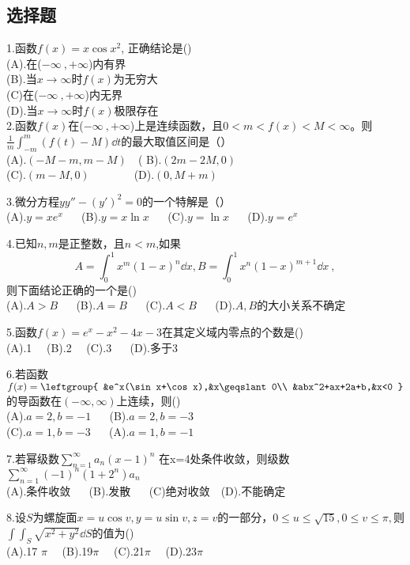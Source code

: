 



\subsection{选择题}
1.函数$f(x)=x\cos x^2$, 正确结论是()\\
(A).在($-\infty~,+\infty$)内有界\\
(B).当$x\to\infty$时$f(x)$为无穷大\\
(C)在($-\infty~,+\infty$)内无界\\
(D).当$x\to\infty$时$f(x)$极限存在\\

2.函数$f(x)$在($-\infty~,+\infty$)上是连续函数，且$0<m<f(x)<M<\infty$。则
$ \frac{1}{m} \int_{-m}^{m}(f(t)-M )\dd{t}$的最大取值区间是（）\\
(A).$(-M-m,m-M) \quad$( B).$ (2m-2M,0)$\\ (C).$(m-M,0)\qquad \qquad $(D).$(0,M+m)$

3.微分方程$y y''-(y')^2=0$的一个特解是（）\\
(A).$y=xe^x$ $\quad$ (B).$y=x\ln x$ $\quad$ (C).$y=\ln x$  $\quad$ (D).$y=e^x$

4.已知$n,m$是正整数，且$n<m$,如果
\begin{equation}
A=\int_{0}^{1} x^m(1-x)^n \dd{x},B=\int_{0}^{1}x^n(1-x)^{m+1} \dd{x}~,
\end{equation}则下面结论正确的一个是()\\
(A).$A>B$ $\quad$ (B).$A=B$ $\quad$ (C).$A<B$ $\quad$ (D).$A,B$的大小关系不确定

5.函数$f(x)=e^x-x^2-4x-3$在其定义域内零点的个数是()\\
(A).1 $\quad$(B).2 $\quad$(C).3 $\quad$ (D).多于3

6.若函数$f(x)=\leftgroup{
    &e^x(\sin x+\cos x),&x\geqslant0\\
    &abx^2+ax+2a+b,&x<0
    }$
    的导函数在$(-\infty,\infty)$上连续，则()\\
    (A).$a=2,b=-1$   $\quad$  (B).$a=2,b=-3$   \\
    (C).$a=1,b=-3$   $\quad$   (A).$a=1,b=-1$   

7.若幂级数$\displaystyle \sum_{n=1}^\infty a_n(x-1)^n$ 
在x=4处条件收敛，则级数$\displaystyle \sum_{n=1}^\infty (-1)^n(1+2^n)a_n $\\
(A).条件收敛 $\quad$ (B).发散 $\quad$ (C)绝对收敛$\quad$(D).不能确定

8.设$S$为螺旋面$x=u\cos v,y=u\sin v,z=v$的一部分，$0\leqslant u \leqslant \sqrt{15},0 \leqslant v \leqslant \pi,$则$\int \int_{S} \sqrt{x^2+y^2} \dd{S}$的值为()\\
(A).17 $\pi \quad$ (B).19$ \pi \quad$ (C).21$ \pi \quad$  (D).23$ \pi \quad$

